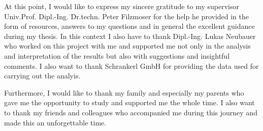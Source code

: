 At this point, I would like to express my sincere gratitude to my supervisor Univ.Prof. Dipl.-Ing. Dr.techn. Peter Filzmoser for the help he provided in the form of resources, answers to my questions and in general the excellent guidance during my thesis. In this context I also have to thank Dipl.-Ing. Lukas Neubauer who worked on this project with me and supported me not only in the analysis and interpretation of the results but also with suggestions and insightful comments. I also want to thank Schrankerl GmbH for providing the data used for carrying out the analyis.

Furthermore, I would like to thank my family and especially my parents who gave me the opportunity to study and supported me the whole time. I also want to thank my friends and colleagues who accompanied me during this journey and made this an unforgettable time. 